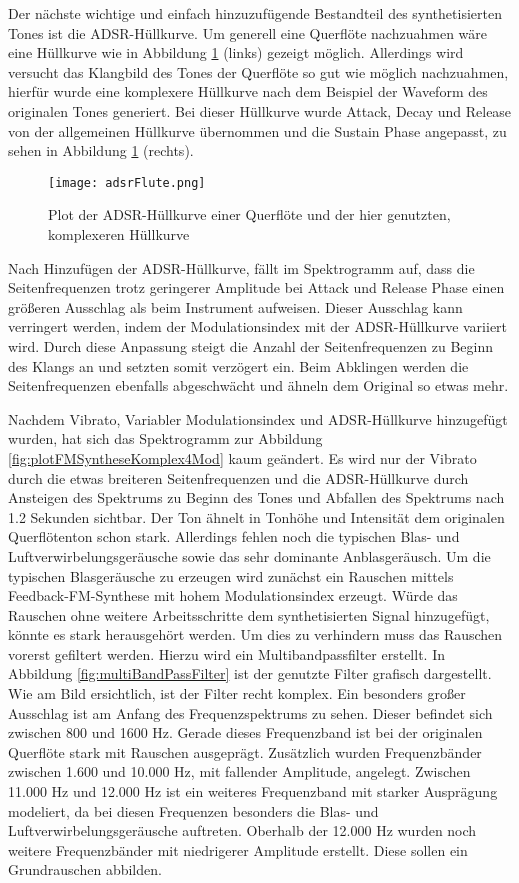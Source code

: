 Der nächste wichtige und einfach hinzuzufügende Bestandteil des synthetisierten Tones ist die ADSR-Hüllkurve. Um generell eine Querflöte nachzuahmen wäre eine Hüllkurve wie in Abbildung \ref{fig:adsrFlute} (links) gezeigt möglich. Allerdings wird versucht das Klangbild des Tones der Querflöte so gut wie möglich nachzuahmen, hierfür wurde eine komplexere Hüllkurve nach dem Beispiel der Waveform des originalen Tones generiert. Bei dieser Hüllkurve wurde Attack, Decay und Release von der allgemeinen Hüllkurve übernommen und die Sustain Phase angepasst, zu sehen in Abbildung \ref{fig:adsrFlute} (rechts). 

\begin{figure} [ht]
\centering
  \texttt{[image: adsrFlute.png]}
\caption{Plot der ADSR-Hüllkurve einer Querflöte und der hier genutzten, komplexeren Hüllkurve}
\label{fig:adsrFlute}
\end{figure}

Nach Hinzufügen der ADSR-Hüllkurve, fällt im Spektrogramm auf, dass die Seitenfrequenzen trotz geringerer Amplitude bei Attack und Release Phase einen größeren Ausschlag als beim Instrument aufweisen. Dieser Ausschlag kann verringert werden, indem der Modulationsindex mit der ADSR-Hüllkurve variiert wird. Durch diese Anpassung steigt die Anzahl der Seitenfrequenzen zu Beginn des Klangs an und setzten somit verzögert ein. Beim Abklingen werden die Seitenfrequenzen ebenfalls abgeschwächt und ähneln dem Original so etwas mehr.

Nachdem Vibrato, Variabler Modulationsindex und ADSR-Hüllkurve hinzugefügt wurden, hat sich das Spektrogramm zur Abbildung \ref{fig:plotFMSyntheseKomplex4Mod} kaum geändert. Es wird nur der Vibrato durch die etwas breiteren Seitenfrequenzen und die ADSR-Hüllkurve durch Ansteigen des Spektrums zu Beginn des Tones und Abfallen des Spektrums nach 1.2 Sekunden sichtbar. Der Ton ähnelt in Tonhöhe und Intensität dem originalen Querflötenton schon stark. Allerdings fehlen noch die typischen Blas- und Luftverwirbelungsgeräusche sowie das sehr dominante Anblasgeräusch. Um die typischen Blasgeräusche zu erzeugen wird zunächst ein Rauschen mittels Feedback-FM-Synthese mit hohem Modulationsindex erzeugt. Würde das Rauschen ohne weitere Arbeitsschritte dem synthetisierten Signal hinzugefügt, könnte es stark herausgehört werden. Um dies zu verhindern muss das Rauschen vorerst gefiltert werden. Hierzu wird ein Multibandpassfilter erstellt. In Abbildung \ref{fig:multiBandPassFilter} ist der genutzte Filter grafisch dargestellt. Wie am Bild ersichtlich, ist der Filter recht komplex. Ein besonders großer Ausschlag ist am Anfang des Frequenzspektrums zu sehen. Dieser befindet sich zwischen 800 und 1600 Hz. Gerade dieses Frequenzband ist bei der originalen Querflöte stark mit Rauschen ausgeprägt. Zusätzlich wurden Frequenzbänder zwischen 1.600 und 10.000 Hz, mit fallender Amplitude, angelegt. Zwischen 11.000 Hz und 12.000 Hz ist ein weiteres Frequenzband mit starker Ausprägung modeliert, da bei diesen Frequenzen besonders die Blas- und Luftverwirbelungsgeräusche auftreten. Oberhalb der 12.000 Hz wurden noch weitere Frequenzbänder mit niedrigerer Amplitude erstellt. Diese sollen ein Grundrauschen abbilden.

